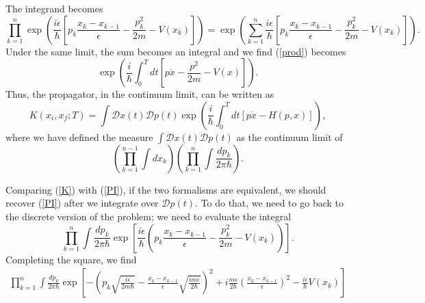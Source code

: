 \documentclass[12pt,a4paper]{article}
\begin{document}
The integrand becomes
\begin{equation}
    \prod_{k=1}^{n}\exp\left(\frac{i\epsilon}{\hbar}\left[p_k\frac{x_k-x_{k-1}}{\epsilon} -\frac{p_k^2}{2m} - V(x_k)\right]\right) = \exp\left(\sum_{k=1}^n\frac{i\epsilon}{\hbar}\left[p_k\frac{x_k-x_{k-1}}{\epsilon} -\frac{p_k^2}{2m} - V(x_k)\right]\right).
    \label{prod}
\end{equation}
Under the same limit, the sum becomes an integral and we find (\ref{prod}) becomes
\begin{equation}
    \exp\left(\frac{i}{\hbar}\int^T_0 dt\left[p\dot{x}
-\frac{p^2}{2m}-V(x)\right]\right).
\end{equation}
Thus, the propagator, in the continuum limit, can be written as
\begin{equation}
    K(x_i,x_f;T) = \int\mathcal{D}x(t)\mathcal{D}p(t)\exp\left(\frac{i}{\hbar}\int^T_0 dt\left[p\dot{x}
-H(p,x)\right]\right),
\label{K}
\end{equation}
where we have defined the measure $\int\mathcal{D}x(t)\mathcal{D}p(t)$ as the continuum limit of
\begin{equation}
    \left(\prod_{k=1}^{n-1}\int dx_k\right)\left(\prod_{k=1}^{n}\int \frac{dp_k}{2\pi\hbar}\right).
\end{equation}

Comparing (\ref{K}) with (\ref{PI}), if the two formalisms are equivalent, we should recover (\ref{PI}) after we integrate over $\mathcal{D}p(t)$. To do that, we need to go back to the discrete version of the problem; we need to evaluate the integral
\begin{equation}
    \prod_{k=1}^n\int\frac{dp_k}{2\pi\hbar}\exp\left[\frac{i\epsilon}{\hbar}\left(p_k\frac{x_k-x_{k-1}}{\epsilon}-\frac{p_k^2}{2m} - V(x_k)\right)\right].
\end{equation}
Completing the square, we find
\begin{equation}
\begin{aligned}
    \prod_{k=1}^n\int\frac{dp_k}{2\pi\hbar}\exp\left[-\left(p_k\sqrt{\frac{i\epsilon}{2m\hbar}}-\frac{x_k-x_{k-1}}{\epsilon}\sqrt{\frac{im\epsilon}{2\hbar}}\right)^2 + i\frac{m\epsilon}{2\hbar}\left(\frac{x_k-x_{k-1}}{\epsilon}\right)^2 -  \frac{i\epsilon}{\hbar}V(x_k)\right]
\end{aligned}
\end{equation}
\end{document}
